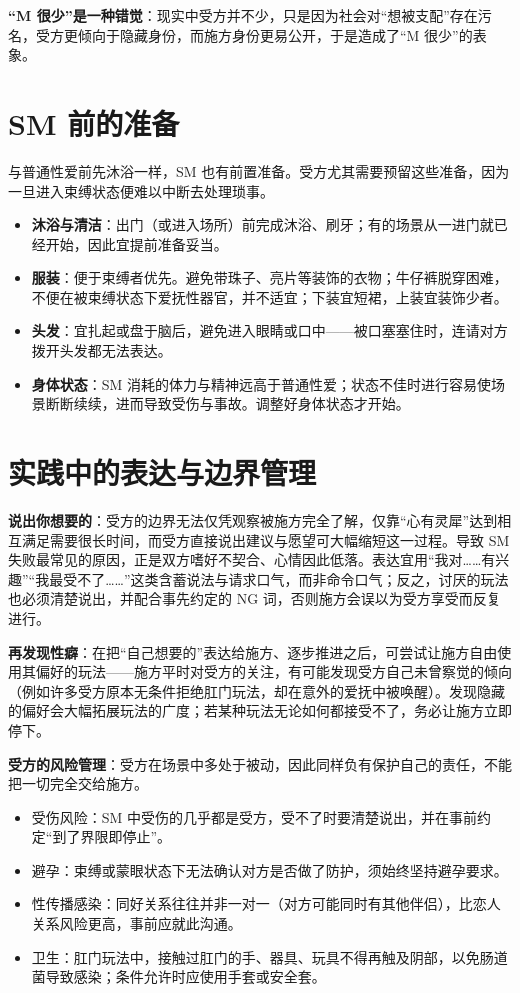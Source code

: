 \documentclass[12pt,UTF8]{ctexbook}
\begin{document}
\noindent\textbf{“M 很少”是一种错觉}：现实中受方并不少，只是因为社会对“想被支配”存在污名，受方更倾向于隐藏身份，而施方身份更易公开，于是造成了“M 很少”的表象。

\section{SM 前的准备}

与普通性爱前先沐浴一样，SM 也有前置准备。受方尤其需要预留这些准备，因为一旦进入束缚状态便难以中断去处理琐事。

\begin{itemize}
\item \textbf{沐浴与清洁}：出门（或进入场所）前完成沐浴、刷牙；有的场景从一进门就已经开始，因此宜提前准备妥当。
\item \textbf{服装}：便于束缚者优先。避免带珠子、亮片等装饰的衣物；牛仔裤脱穿困难，不便在被束缚状态下爱抚性器官，并不适宜；下装宜短裙，上装宜装饰少者。
\item \textbf{头发}：宜扎起或盘于脑后，避免进入眼睛或口中——被口塞塞住时，连请对方拨开头发都无法表达。
\item \textbf{身体状态}：SM 消耗的体力与精神远高于普通性爱；状态不佳时进行容易使场景断断续续，进而导致受伤与事故。调整好身体状态才开始。
\end{itemize}

\section{实践中的表达与边界管理}

\noindent\textbf{说出你想要的}：受方的边界无法仅凭观察被施方完全了解，仅靠“心有灵犀”达到相互满足需要很长时间，而受方直接说出建议与愿望可大幅缩短这一过程。导致 SM 失败最常见的原因，正是双方嗜好不契合、心情因此低落。表达宜用“我对……有兴趣”“我最受不了……”这类含蓄说法与请求口气，而非命令口气；反之，讨厌的玩法也必须清楚说出，并配合事先约定的 NG 词，否则施方会误以为受方享受而反复进行。

\noindent\textbf{再发现性癖}：在把“自己想要的”表达给施方、逐步推进之后，可尝试让施方自由使用其偏好的玩法——施方平时对受方的关注，有可能发现受方自己未曾察觉的倾向（例如许多受方原本无条件拒绝肛门玩法，却在意外的爱抚中被唤醒）。发现隐藏的偏好会大幅拓展玩法的广度；若某种玩法无论如何都接受不了，务必让施方立即停下。

\noindent\textbf{受方的风险管理}：受方在场景中多处于被动，因此同样负有保护自己的责任，不能把一切完全交给施方。

\begin{itemize}
\item 受伤风险：SM 中受伤的几乎都是受方，受不了时要清楚说出，并在事前约定“到了界限即停止”。
\item 避孕：束缚或蒙眼状态下无法确认对方是否做了防护，须始终坚持避孕要求。
\item 性传播感染：同好关系往往并非一对一（对方可能同时有其他伴侣），比恋人关系风险更高，事前应就此沟通。
\item 卫生：肛门玩法中，接触过肛门的手、器具、玩具不得再触及阴部，以免肠道菌导致感染；条件允许时应使用手套或安全套。
\end{itemize}
\end{document}
